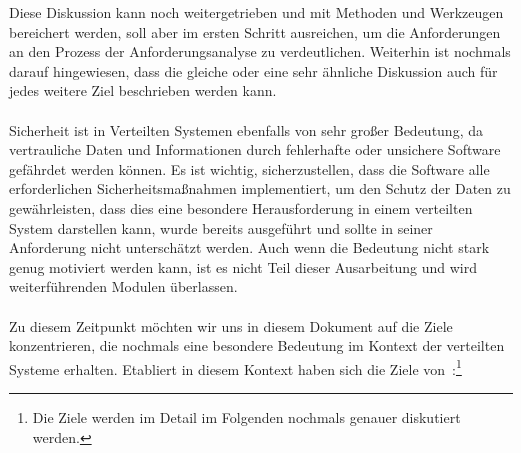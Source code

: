 \documentclass[../vs-script-first-v01.tex]{subfiles}
\begin{document}
Diese Diskussion kann noch weitergetrieben und mit Methoden und Werkzeugen bereichert werden, soll aber im ersten Schritt ausreichen, um die Anforderungen an den Prozess der Anforderungsanalyse zu verdeutlichen. Weiterhin ist nochmals darauf hingewiesen, dass die gleiche oder eine sehr ähnliche Diskussion auch für jedes weitere Ziel beschrieben werden kann.
\\\\
Sicherheit ist in Verteilten Systemen ebenfalls von sehr großer Bedeutung, da vertrauliche Daten und Informationen durch fehlerhafte oder unsichere Software gefährdet werden können. Es ist wichtig, sicherzustellen, dass die Software alle erforderlichen Sicherheitsmaßnahmen implementiert, um den Schutz der Daten zu gewährleisten, dass dies eine besondere Herausforderung in einem verteilten System darstellen kann, wurde bereits ausgeführt und sollte in seiner Anforderung nicht unterschätzt werden. Auch wenn die Bedeutung nicht stark genug motiviert werden kann, ist es nicht Teil dieser Ausarbeitung und wird weiterführenden Modulen überlassen.
\\\\
Zu diesem Zeitpunkt möchten wir uns in diesem Dokument auf die Ziele konzentrieren, die nochmals eine besondere Bedeutung im Kontext der verteilten Systeme erhalten. Etabliert in diesem Kontext haben sich die Ziele von~\cite{tanenbaum2017distributed}:\footnote{Die Ziele werden im Detail im Folgenden nochmals genauer diskutiert werden.}

\label{Woche01}

\end{document}
